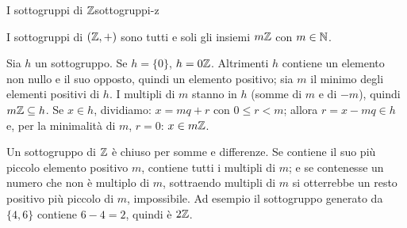 \begin{concetto}
\begin{Proposizione}{I sottogruppi di $\mathbb{Z}$}{sottogruppi-z}
    \begin{prerequisiti}
    \end{prerequisiti}
    I sottogruppi di $(\mathbb{Z}, +)$ sono tutti e soli gli insiemi $m\mathbb{Z}$ con $m \in \mathbb{N}$.
\end{Proposizione}
\begin{dimostrazione}
    \facoltativa
    Sia $h$ un sottogruppo. Se $h = \{0\}$, $h = 0\mathbb{Z}$. Altrimenti $h$ contiene un elemento non nullo e il suo opposto, quindi un elemento
    positivo; sia $m$ il minimo degli elementi positivi di $h$. I multipli di $m$ stanno in $h$ (somme di $m$ e di $-m$), quindi $m\mathbb{Z} \subseteq h$.
    Se $x \in h$, dividiamo: $x = mq + r$ con $0 \leq r < m$; allora $r = x - mq \in h$ e, per la minimalità di $m$, $r = 0$: $x \in m\mathbb{Z}$.
\end{dimostrazione}
\end{concetto}

\begin{spiegazione}
    Un sottogruppo di $\mathbb{Z}$ è chiuso per somme e differenze. Se contiene il suo più piccolo elemento positivo $m$, contiene tutti i
    multipli di $m$; e se contenesse un numero che non è multiplo di $m$, sottraendo multipli di $m$ si otterrebbe un resto positivo più
    piccolo di $m$, impossibile. Ad esempio il sottogruppo generato da $\{4, 6\}$ contiene $6 - 4 = 2$, quindi è $2\mathbb{Z}$.
\end{spiegazione}
